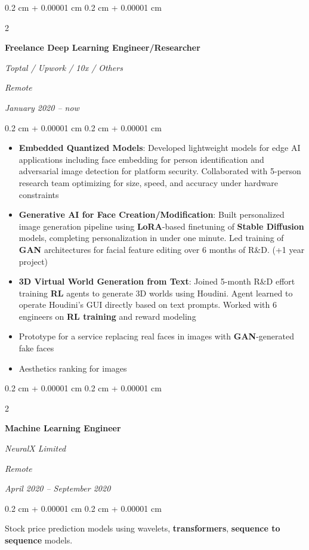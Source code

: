 \documentclass[10pt, letterpaper]{article}
\newenvironment{highlights}{
	\begin{itemize}[
		topsep=0.10 cm,
		parsep=0.10 cm,
		partopsep=0pt,
		itemsep=0pt,
		leftmargin=0.4 cm + 10pt
	]
	}{
	\end{itemize}
} %
\newenvironment{onecolentry}{
	\begin{adjustwidth}{
		0.2 cm + 0.00001 cm
	}{
		0.2 cm + 0.00001 cm
	}
	}{
	\end{adjustwidth}
} %
\newenvironment{twocolentry}[2][]{
	\onecolentry
	\def\secondColumn{#2}
	\setcolumnwidth{\fill, 5.5 cm}
	\begin{paracol}{2}
	}{
		\switchcolumn \raggedleft \secondColumn
	\end{paracol}
	\endonecolentry
} %
\newcommand{\dlterm}[1]{\textbf{#1}}
\begin{document}
	\vspace{0.2 cm}

	\begin{twocolentry}{
		\textit{Remote}
		
		\textit{January 2020 – now}}
		\textbf{Freelance Deep Learning Engineer/Researcher}

		\textit{Toptal / Upwork / 10x / Others}
	\end{twocolentry}

	\vspace{0.10 cm}
	\begin{onecolentry}
		\begin{highlights}
			\item \textbf{Embedded Quantized Models}: Developed lightweight models for edge AI applications including face embedding for person identification and adversarial image detection for platform security. Collaborated with 5-person research team optimizing for size, speed, and accuracy under hardware constraints
			\item \textbf{\dlterm{Generative AI} for Face Creation/Modification}: Built personalized image generation pipeline using \dlterm{LoRA}-based finetuning of \dlterm{Stable Diffusion} models, completing personalization in under one minute. Led training of \dlterm{GAN} architectures for facial feature editing over 6 months of R\&D. (+1 year project)
			\item \textbf{3D Virtual World Generation from Text}: Joined 5-month R\&D effort training \dlterm{RL} agents to generate 3D worlds using Houdini. Agent learned to operate Houdini's GUI directly based on text prompts. Worked with 6 engineers on \dlterm{RL training} and reward modeling
			\item Prototype for a service replacing real faces in images with \dlterm{GAN}-generated fake faces
			\item Aesthetics ranking for images
		\end{highlights}
	\end{onecolentry}

	\vspace{0.2 cm}

	\begin{twocolentry}{
		\textit{Remote}
		
		\textit{April 2020 – September 2020}}
		\textbf{Machine Learning Engineer}
		
		\textit{NeuralX Limited}
	\end{twocolentry}

	\vspace{0.10 cm}
	\begin{onecolentry}
		Stock price prediction models using wavelets, \dlterm{transformers}, \dlterm{sequence to sequence} models.
	\end{onecolentry}
\end{document}
